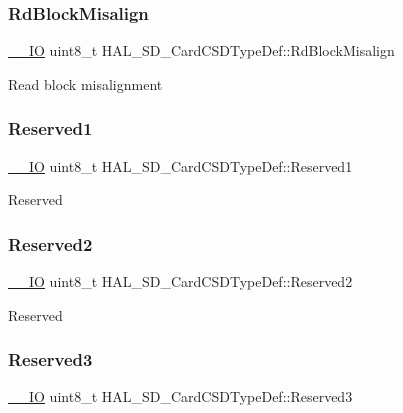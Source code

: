 \subsubsection{\texorpdfstring{RdBlockMisalign}{RdBlockMisalign}}
{\footnotesize\ttfamily \mbox{\hyperlink{core__sc300_8h_aec43007d9998a0a0e01faede4133d6be}{\+\_\+\+\_\+\+IO}} uint8\+\_\+t H\+A\+L\+\_\+\+S\+D\+\_\+\+Card\+C\+S\+D\+Type\+Def\+::\+Rd\+Block\+Misalign}

Read block misalignment \mbox{\label{struct_h_a_l___s_d___card_c_s_d_type_def_a2256509272f03fa407592ca84cf85c23}} 
\subsubsection{\texorpdfstring{Reserved1}{Reserved1}}
{\footnotesize\ttfamily \mbox{\hyperlink{core__sc300_8h_aec43007d9998a0a0e01faede4133d6be}{\+\_\+\+\_\+\+IO}} uint8\+\_\+t H\+A\+L\+\_\+\+S\+D\+\_\+\+Card\+C\+S\+D\+Type\+Def\+::\+Reserved1}

Reserved \mbox{\label{struct_h_a_l___s_d___card_c_s_d_type_def_a40eb46a55dbeeb4826c0416d3217fdcd}} 
\subsubsection{\texorpdfstring{Reserved2}{Reserved2}}
{\footnotesize\ttfamily \mbox{\hyperlink{core__sc300_8h_aec43007d9998a0a0e01faede4133d6be}{\+\_\+\+\_\+\+IO}} uint8\+\_\+t H\+A\+L\+\_\+\+S\+D\+\_\+\+Card\+C\+S\+D\+Type\+Def\+::\+Reserved2}

Reserved \mbox{\label{struct_h_a_l___s_d___card_c_s_d_type_def_afd22d11554e4af4020db815fd58ee735}} 
\subsubsection{\texorpdfstring{Reserved3}{Reserved3}}
{\footnotesize\ttfamily \mbox{\hyperlink{core__sc300_8h_aec43007d9998a0a0e01faede4133d6be}{\+\_\+\+\_\+\+IO}} uint8\+\_\+t H\+A\+L\+\_\+\+S\+D\+\_\+\+Card\+C\+S\+D\+Type\+Def\+::\+Reserved3}

